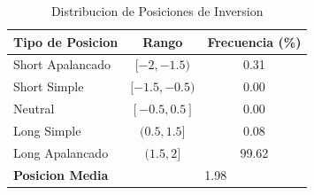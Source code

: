 \begin{table}[H]
\centering
\caption{Distribucion de Posiciones de Inversion}
\label{tab:positions}
\begin{tabular}{lcc}
\toprule
\textbf{Tipo de Posicion} & \textbf{Rango} & \textbf{Frecuencia (\%)} \\
\midrule
Short Apalancado & $[-2, -1.5)$ & 0.31 \\
Short Simple & $[-1.5, -0.5)$ & 0.00 \\
Neutral & $[-0.5, 0.5]$ & 0.00 \\
Long Simple & $(0.5, 1.5]$ & 0.08 \\
Long Apalancado & $(1.5, 2]$ & 99.62 \\
\midrule
\textbf{Posicion Media} & \multicolumn{2}{c}{1.98} \\
\bottomrule
\end{tabular}
\end{table}
